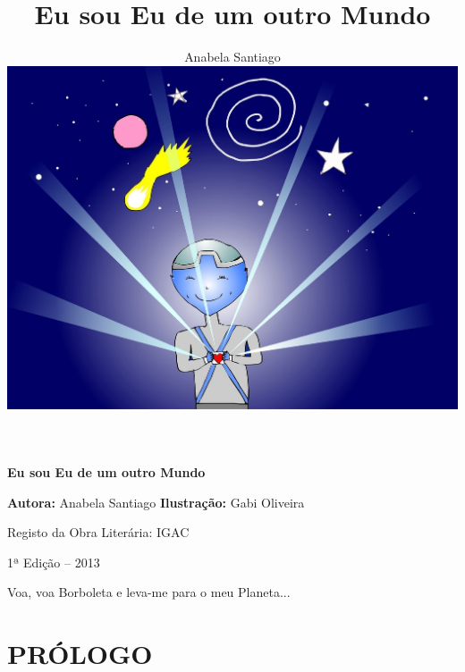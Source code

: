 \documentclass[12pt, a4paper, twoside]{memoir}
\title{\textbf{Eu sou Eu de um outro Mundo}}
\author{Anabela Santiago\\[5mm] \includegraphics[width=6in]{capa}}
\date{}
\begin{document}
\frontmatter
{} %
\pagestyle{empty}
\maketitle
\newpage\null\thispagestyle{empty}\newpage %

\vspace*{1cm} %
\begin{center}
    \textbf{
        Eu sou Eu de um outro Mundo
    }
\end{center}

\begin{vplace}
    \textbf{Autora:} Anabela Santiago
    \bigbreak
    \textbf{Ilustração:} Gabi Oliveira

\end{vplace}
Registo da Obra Literária: IGAC

\vfill
\begin{center}
    1ª Edição – 2013
\end{center}

\newpage
\newpage\null\thispagestyle{empty}\newpage %

\begin{KeepFromToc}
\tableofcontents
\thispagestyle{empty}
\end{KeepFromToc}
\newpage

\begin{vplace}[4]
    \begin{flushright}
        Voa, voa Borboleta e leva-me para o meu Planeta...
    \end{flushright}
\end{vplace}
\newpage

\mainmatter
\pagestyle{plain}

\chapter{PRÓLOGO}

\end{document}
